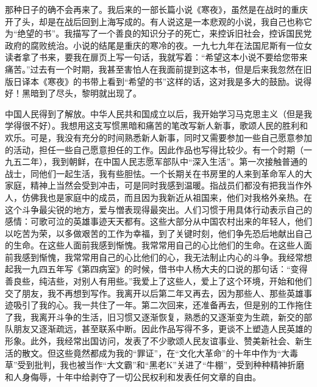 \par 那种日子的确不会再来了。我后来的一部长篇小说《寒夜》，虽然是在战时的重庆开了头，却是在战后回到上海写成的。有人说这是一本悲观的小说，我自己也称它为“绝望的书”。我描写了一个善良的知识分子的死亡，来控诉旧社会，控诉国民党政府的腐败统治。小说的结尾是重庆的寒冷的夜。一九七九年在法国尼斯有一位女读者拿了书来，要我在扉页上写一句话，我就写着：“希望这本小说不要给您带来痛苦。”过去有一个时期，我甚至害怕人在我面前提到这本书，但是后来我忽然在旧版日译本《寒夜》的书带上看到“希望的书”这样的话，这对我是多大的鼓励。说得好！黑暗到了尽头，黎明就出现了。
\par 中国人民得到了解放。中华人民共和国成立以后，我开始学习马克思主义（但是我学得很不好）。我想用这支写惯黑暗和痛苦的笔改写新人新事，歌颂人民的胜利和欢乐。可是，我没有充分的时间熟悉新人新事，同时又需要参加一些自己愿意参加的活动，担任一些自己愿意担任的工作。因此作品也写得比较少。有一个时期（一九五二年），我到朝鲜，在中国人民志愿军部队中“深入生活”。第一次接触普通的战士，同他们一起生活，我有些胆怯。一个长期关在书房里的人来到革命军人的大家庭，精神上当然会受到冲击，可是同时我感到温暖。指战员们都没有把我当作外人，仿佛我也是家庭中的成员，而且因为我新近从祖国来，他们对我格外亲热。在这个斗争最尖锐的地方，爱与憎表现得最突出。人们习惯于用具体行动表示自己的感情：可歌可泣的英雄事迹天天都有。这些大部分从中国农村出来的年轻人，他们以吃苦为荣，以多做艰苦的工作为幸福，到了关键时刻，他们争先恐后地献出自己的生命。在这些人面前我感到惭愧。我常常用自己的心比他们的生命。在这些人面前我感到惭愧，我常常用自己的心比他们的心，我无法制止内心的斗争。我经常想起我一九四五年写《第四病室》的时候，借书中人杨大夫的口说的那句话：“变得善良些，纯洁些，对别人有用些。”我爱上了这些人，爱上了这个环境，开始和他们交了朋友，我不再想到写作。我离开以后第二年又再去，因为那些人、那些英雄事迹吸引了我的心。我一共住了一年。第二次回来，还准备再去，但是别的工作拖住了我，我离开斗争的生活，旧习惯又逐渐恢复，熟悉的又逐渐变为生疏，新交的部队朋友又逐渐疏远，甚至联系中断。因此作品写得不多，更谈不上塑造人民英雄的形象。此外，我经常出国访问，发表了不少歌颂人民友谊事业、赞美新社会、新生活的散文。但这些竟然都成为我的“罪证”，在“文化大革命”的十年中作为“大毒草”受到批判，我也被当作“大文霸”和“黑老K”关进了“牛棚”，受到种种精神折磨和人身侮辱，十年中给剥夺了一切公民权利和发表任何文章的自由。
